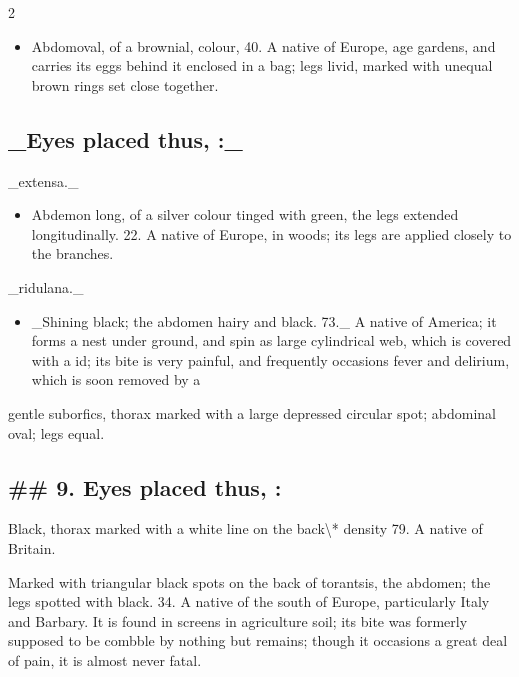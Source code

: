 \documentclass[10pt]{article}
\begin{document}
\begin{multicols}{2}
\begin{itemize}\setlength{\itemsep}{1pt}
\item Abdomoval, of a brownial, colour, 40. A native of Europe, age gardens, and carries its eggs behind it enclosed in a bag; legs livid, marked with unequal brown rings set close together.
\end{itemize}
\subsection*{\_Eyes placed thus, :\_}
\_extensa.\_

\begin{itemize}\setlength{\itemsep}{1pt}
\item Abdemon long, of a silver colour tinged with green, the legs extended longitudinally. 22. A native of Europe, in woods; its legs are applied closely to the branches.
\end{itemize}
\_ridulana.\_

\begin{itemize}\setlength{\itemsep}{1pt}
\item \_Shining black; the abdomen hairy and black. 73.\_ A native of America; it forms a nest under ground, and spin as large cylindrical web, which is covered with a id; its bite is very painful, and frequently occasions fever and delirium, which is soon removed by a
\end{itemize}
gentle suborfics, thorax marked with a large depressed circular spot; abdominal oval; legs equal.

\subsection*{\#\# 9. Eyes placed thus, :}
Black, thorax marked with a white line on the back\textbackslash{}* density 79. A native of Britain.

Marked with triangular black spots on the back of torantsis, the abdomen; the legs spotted with black. 34. A native of the south of Europe, particularly Italy and Barbary. It is found in screens in agriculture soil; its bite was formerly supposed to be combble by nothing but remains; though it occasions a great deal of pain, it is almost never fatal.


\end{multicols}
\end{document}
